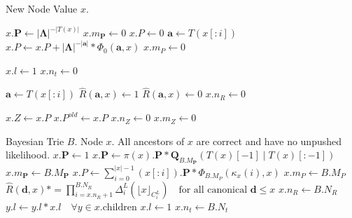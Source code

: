 \begin{algorithm}[H]
\caption{Complete Initialization}
\label{alg:complete-initialization}
\begin{algorithmic}[1]
\Require New Node Value $x$.

\State $x.\boldsymbol{P} \gets |\boldsymbol{\Lambda}|^{-|T(x)|}$
\State $x.m_\mathbf{P} \gets 0$
\State $x.P \gets 0$
    \State $\mathbf{a} \gets T(x[:i])$
    \State $x.P \gets x.P + |\boldsymbol{\Lambda}|^{-|\mathbf{a}|} * \Phi_0(\mathbf{a}, x)$
\EndFor
\State $x.m_P \gets 0$

\State $x.l \gets 1$
\State $x.n_t \gets 0$

    \State $\mathbf{a} \gets T(x[:i])$
        \State $\widehat{R}(\mathbf{a}, x) \gets 1$
    \Else
        \State $\widehat{R}(\mathbf{a}, x) \gets 0$
    \EndIf
\EndFor
\State $x.n_R \gets 0$

\State $x.Z \gets x.P$
\State $x.P^{old} \gets x.P$
\State $x.n_Z \gets 0$
\State $x.m_Z \gets 0$
\end{algorithmic}
\end{algorithm}

\begin{algorithm}[H]
\caption{Complete Push}
\begin{algorithmic}[1]
\Require Bayesian Trie $B$.
\Require Node $x$.
\Require All ancestors of $x$ are correct and have no unpushed likelihood.
    \State $x.\mathbf{P} \gets 1$
\Else
    \State $x.\mathbf{P} \gets \pi(x).\mathbf{P} * \mathbf{Q}_{B.M_\mathbf{P}}(T(x)[-1] \mid T(x)[:-1])$
\EndIf
\State $x.m_\mathbf{P} \gets B.M_\mathbf{P}$
\State $x.P \gets \sum_{i=0}^{|x|-1} (x[:i]).\mathbf{P} * \Phi_{B.M_P}(\kappa_x(i), x)$
\State $x.m_P \gets B.M_P$
\State $\widehat{R}(\mathbf{d}, x) \mathrel{*=} \prod_{i=x.n_R+1}^{B.N_R} \Delta^L_i(\lfloor x \rfloor_{C^L_i}) \quad \text{for all canonical } \mathbf{d} \leq x$
\State $x.n_R \gets B.N_R$
\State $y.l \gets y.l * x.l \quad \forall y \in x.\text{children}$
\State $x.l \gets 1$
\State $x.n_t \gets B.N_t$
\end{algorithmic}
\end{algorithm}

